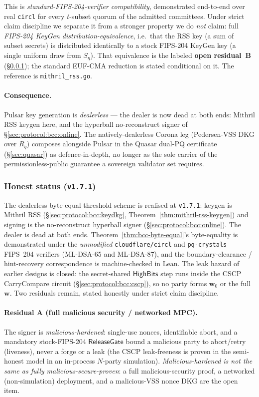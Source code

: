 This is \emph{standard-FIPS-204-verifier compatibility}, demonstrated
end-to-end over real \texttt{circl} for every $t$-subset quorum of the
admitted committees. Under strict claim discipline we separate it from a
stronger property we do \emph{not} claim: full \emph{FIPS-204 KeyGen
distribution-equivalence}, i.e.\ that the RSS key (a sum of subset
secrets) is distributed identically to a stock FIPS-204 \textsf{KeyGen}
key (a single uniform draw from $S_\eta$). That equivalence is the
labeled \textbf{open residual~B} (\S\ref{sec:protocol:bcc:status}); the
standard EUF-CMA reduction is stated conditional on it. The reference is
\texttt{mithril\_rss.go}.

\paragraph{Consequence.} Pulsar key generation is \emph{dealerless} --- the
dealer is now dead at both ends: Mithril RSS keygen here, and the
hyperball no-reconstruct signer of \S\ref{sec:protocol:bcc:online}. The
natively-dealerless Corona leg \cite{corona} (Pedersen-VSS DKG over $R_q$)
composes alongside Pulsar in the Quasar dual-PQ certificate
(\S\ref{sec:quasar}) as defence-in-depth, no longer as the sole carrier of
the permissionless-public guarantee a sovereign validator set requires.

\subsubsection{Honest status (\texttt{v1.7.1})}
\label{sec:protocol:bcc:status}

The dealerless byte-equal threshold scheme is realised at \texttt{v1.7.1}:
keygen is Mithril RSS (\S\ref{sec:protocol:bcc:keydkg},
Theorem~\ref{thm:mithril-rss-keygen}) and signing is the no-reconstruct
hyperball signer (\S\ref{sec:protocol:bcc:online}). The dealer is dead at
both ends. Theorem~\ref{thm:bcc-byte-equal}'s byte-equality is demonstrated
under the \emph{unmodified} \texttt{cloudflare/circl} and
\texttt{pq-crystals} FIPS~204 verifiers (ML-DSA-65 and ML-DSA-87), and the
boundary-clearance / hint-recovery correspondence is machine-checked in
Lean. The leak hazard of earlier designs is closed: the secret-shared
$\mathsf{HighBits}$ step runs inside the CSCP CarryCompare circuit
(\S\ref{sec:protocol:bcc:cscp}), so no party forms $\mathbf{w}_0$ or the
full $\mathbf{w}$. Two residuals remain, stated honestly under strict claim
discipline.

\paragraph{Residual A (full malicious security / networked MPC).} The
signer is \emph{malicious-hardened}: single-use nonces, identifiable abort,
and a mandatory stock-FIPS-204 $\mathsf{ReleaseGate}$ bound a malicious
party to abort/retry (liveness), never a forge or a leak (the CSCP
leak-freeness is proven in the semi-honest model in an in-process $N$-party
simulation). \emph{Malicious-hardened is not the same as fully
malicious-secure-proven}: a full malicious-security proof, a networked
(non-simulation) deployment, and a malicious-VSS nonce DKG are the open
item.

